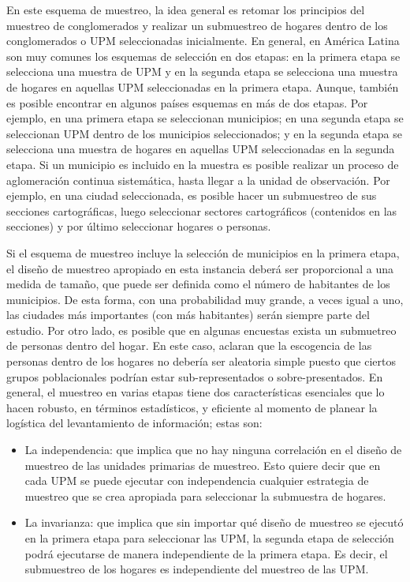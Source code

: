 \documentclass[
  12pt,
  spanish,
]{book}
\providecommand{\tightlist}{%
  \setlength{\itemsep}{0pt}\setlength{\parskip}{0pt}}
\begin{document}
En este esquema de muestreo, la idea general es retomar los principios del muestreo de conglomerados y realizar un submuestreo de hogares dentro de los conglomerados o UPM seleccionadas inicialmente. En general, en América Latina son muy comunes los esquemas de selección en dos etapas: en la primera etapa se selecciona una muestra de UPM y en la segunda etapa se selecciona una muestra de hogares en aquellas UPM seleccionadas en la primera etapa. Aunque, también es posible encontrar en algunos países esquemas en más de dos etapas. Por ejemplo, en una primera etapa se seleccionan municipios; en una segunda etapa se seleccionan UPM dentro de los municipios seleccionados; y en la segunda etapa se selecciona una muestra de hogares en aquellas UPM seleccionadas en la segunda etapa. Si un municipio es incluido en la muestra es posible realizar un proceso de aglomeración continua sistemática, hasta llegar a la unidad de observación. Por ejemplo, en una ciudad seleccionada, es posible hacer un submuestreo de sus secciones cartográficas, luego seleccionar sectores cartográficos (contenidos en las secciones) y por último seleccionar hogares o personas.

Si el esquema de muestreo incluye la selección de municipios en la primera etapa, el diseño de muestreo apropiado en esta instancia deberá ser proporcional a una medida de tamaño, que puede ser definida como el número de habitantes de los municipios. De esta forma, con una probabilidad muy grande, a veces igual a uno, las ciudades más importantes (con más habitantes) serán siempre parte del estudio. Por otro lado, es posible que en algunas encuestas exista un submuetreo de personas dentro del hogar. En este caso, \citet{Clark_Steel_2007} aclaran que la escogencia de las personas dentro de los hogares no debería ser aleatoria simple puesto que ciertos grupos poblacionales podrían estar sub-representados o sobre-presentados. En general, el muestreo en varias etapas tiene dos características esenciales que lo hacen robusto, en términos estadísticos, y eficiente al momento de planear la logística del levantamiento de información; estas son:

\begin{itemize}
\tightlist
\item
  La independencia: que implica que no hay ninguna correlación en el diseño de muestreo de las unidades primarias de muestreo. Esto quiere decir que en cada UPM se puede ejecutar con independencia cualquier estrategia de muestreo que se crea apropiada para seleccionar la submuestra de hogares.
\item
  La invarianza: que implica que sin importar qué diseño de muestreo se ejecutó en la primera etapa para seleccionar las UPM, la segunda etapa de selección podrá ejecutarse de manera independiente de la primera etapa. Es decir, el submuestreo de los hogares es independiente del muestreo de las UPM.
\end{itemize}
\end{document}
